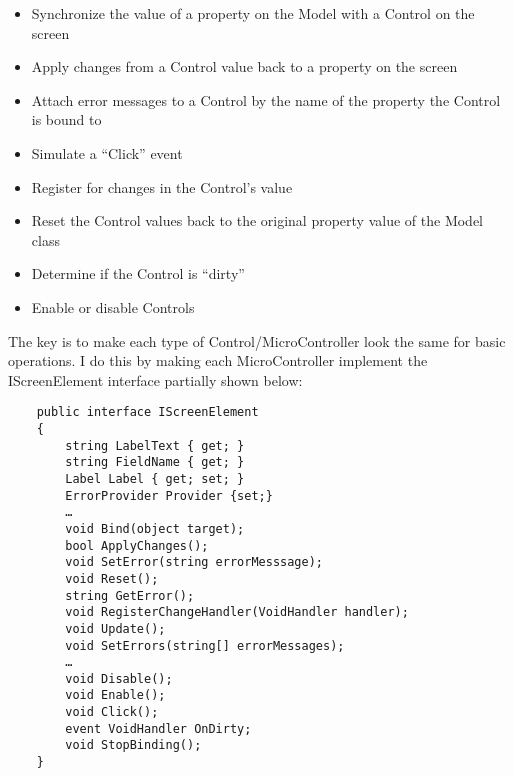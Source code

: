 \documentclass{article}
\begin{document}
{ \begin{itemize}
   \item  Synchronize the value of a property on the Model with a Control on the screen  
 \item  Apply changes from a Control value back to a property on the screen  
 \item  Attach error messages to a Control by the name of the property the Control is bound to  
 \item  Simulate a “Click” event  
 \item  Register for changes in the Control's value  
 \item  Reset the Control values back to the original property value of the Model class  
 \item  Determine if the Control is “dirty”  
 \item  Enable or disable Controls  
  \end{itemize}

The key is to make each type of Control/MicroController look the same for basic operations.  I do this by making each MicroController implement the IScreenElement interface partially shown below:

 \begin{lstlisting}
    public interface IScreenElement
    {
        string LabelText { get; }
        string FieldName { get; }
        Label Label { get; set; }
        ErrorProvider Provider {set;}
        …
        void Bind(object target);
        bool ApplyChanges();
        void SetError(string errorMesssage);
        void Reset();
        string GetError();
        void RegisterChangeHandler(VoidHandler handler);
        void Update();
        void SetErrors(string[] errorMessages);
        …
        void Disable();
        void Enable();
        void Click();
        event VoidHandler OnDirty;
        void StopBinding();
    }
\end{lstlisting}

}
\end{document}
